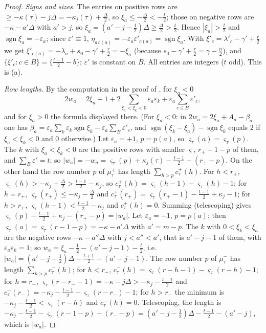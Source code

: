 \documentclass[10pt]{amsart}
\theoremstyle{definition}
\theoremstyle{remark}
\begin{document}
\begin{proof}
\emph{Signs and sizes.} The entries on positive rows are $\ge-\kappa(\tau)-j\Delta=-\kappa_j(\tau)+
\frac\Delta2$, so $\xi_a\le-\frac\Delta2<-\frac t2$; those on negative rows are $-\kappa-a'\Delta$ with
$a'>j$, so $\xi_a=(a'-j-\frac12)\Delta\ge\frac\Delta2>\frac t2$. Hence $|\xi_a|>\frac t2$ and
$\operatorname{sgn}\xi_a=-\varepsilon_a$; since $\varepsilon'\equiv1$, $\eta_{a\,c(a)}=-\varepsilon_a
\varepsilon'_{c(a)}=\operatorname{sgn}\xi_a$. With $\xi'_c=\lambda'_c-\gamma'+\frac r2$ we get
$\xi'_{c(a)}=-\lambda_a+s_0-\gamma'+\frac r2=-\xi_a$ (because $s_0-\gamma'+\frac r2=\gamma-\frac n2$),
and $\{\xi'_c:c\in B\}=\{\frac{t-1}2-b\}$; $\varepsilon'$ is constant on $B$. All entries are
integers ($t$ odd). This is (a).

\emph{Row lengths.} By the computation in the proof of {\cite[Lemma~3.10]{P49}}, for $\xi_a<0$
\[
2w_a=2\xi_a+1+2\!\!\sum_{\xi_a<\xi_k<0}\!\!\varepsilon_a\varepsilon_k+\varepsilon_a\sum_{c\in B}
\varepsilon'_c,
\]
and for $\xi_a>0$ the formula displayed there. (For $\xi_a<0$: in $2w_a=2\xi_a+A_a-\beta_a$ one has
$\beta_a=\varepsilon_a\sum_k\varepsilon_k\operatorname{sgn}\xi_k-\varepsilon_a\sum_B\varepsilon'_c$,
and $\operatorname{sgn}(\xi_k-\xi_a)-\operatorname{sgn}\xi_k$ equals $2$ if $\xi_a<\xi_k<0$ and $0$
otherwise.) Let $\varepsilon_a=+1$, $p=p(a)$, so $\varsigma_\tau(a)=\varsigma_\tau(p)$. The $k$ with
$\xi_a<\xi_k<0$ are the positive rows with smaller $\varsigma$, $r_+-1-p$ of them, and
$\sum_B\varepsilon'=t$; so $|w_a|=-w_a=\varsigma_\tau(p)+\kappa_j(\tau)-\frac{t-1}2-(r_+-p)$. On the
other hand the row number $p$ of $\mu^+_\tau$ has length $\sum_{h>p}c^+_\tau(h)$. For $h<r_+$,
$\varsigma_\tau(h)>-\kappa_j+\frac\Delta2>\frac{t-1}2-\kappa_j$, so $c^+_\tau(h)=\varsigma_\tau(h-1)-
\varsigma_\tau(h)-1$; for $h=r_+$, $\varsigma_\tau(r_+)\le-\kappa_j-\frac\Delta2$ and $c^+_\tau(r_+)=
\varsigma_\tau(r_+-1)-\frac{t-1}2+\kappa_j-1$; for $h>r_+$, $\varsigma_\tau(h-1)<\frac{t-1}2-\kappa_j$
and $c^+_\tau(h)=0$. Summing (telescoping) gives $\varsigma_\tau(p)-\frac{t-1}2+\kappa_j-(r_+-p)=|w_a|$.
Let $\varepsilon_a=-1$, $p=p(a)$; then $\varsigma_\tau(a)=\varsigma_\tau(r-1-p)=-\kappa-a'\Delta$ with
$a'=m-p$. The $k$ with $0<\xi_k<\xi_a$ are the negative rows $-\kappa-a''\Delta$ with $j<a''<a'$, that is
$a'-j-1$ of them, with $\varepsilon_a\varepsilon_k
=1$; so $w_a=\xi_a-\frac12-(a'-j-1)-\frac t2$, i.e.\ $|w_a|=(a'-j-\frac12)\Delta-\frac{t+1}2-(a'-j-1)$.
The row number $p$ of $\mu^-_\tau$ has length $\sum_{h>p}c^-_\tau(h)$; for $h<r_-$,
$c^-_\tau(h)=\varsigma_\tau(r-h-1)-\varsigma_\tau(r-h)-1$; for $h=r_-$, $\varsigma_\tau(r-r_--1)=
-\kappa-j\Delta>-\kappa_j-\frac{t-1}2$ and $c^-_\tau(r_-)=-\kappa_j-\frac{t-1}2-\varsigma_\tau(r-r_-)-1$; for $h>r_-$ the minimum is
$-\kappa_j-\frac{t-1}2<\varsigma_\tau(r-h)$ and $c^-_\tau(h)=0$. Telescoping, the length is
$-\kappa_j-\frac{t-1}2-\varsigma_\tau(r-1-p)-(r_--p)=(a'-j-\frac12)\Delta-\frac{t-1}2-(a'-j)$, which is
$|w_a|$.
\end{proof}
\end{document}
